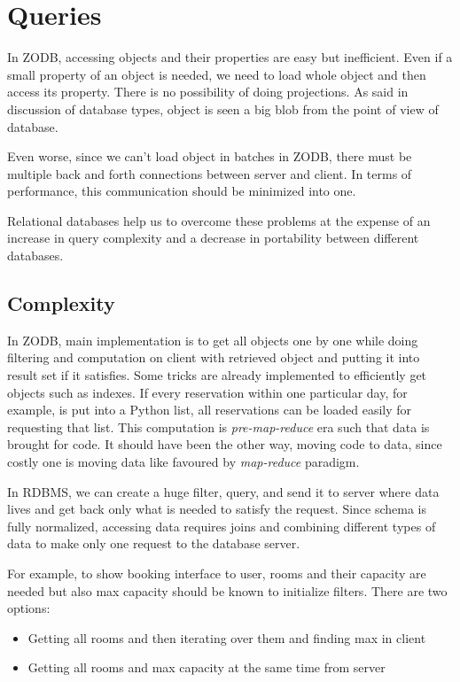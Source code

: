 \section{Queries}

In ZODB, accessing objects and their properties are easy but inefficient. Even if a small property of an object is needed, we need to load whole object and then access its property. There is no possibility of doing projections. As said in discussion of database types, object is seen a big blob from the point of view of database.

Even worse, since we can't load object in batches in ZODB, there must be multiple back and forth connections between server and client. In terms of performance, this communication should be minimized into one.

Relational databases help us to overcome these problems at the expense of an increase in query complexity and a decrease in portability between different databases.

\subsection{Complexity}

In ZODB, main implementation is to get all objects one by one while doing filtering and computation on client with retrieved object and putting it into result set if it satisfies. Some tricks are already implemented to efficiently get objects such as indexes. If every reservation within one particular day, for example, is put into a Python list, all reservations can be loaded easily for requesting that list. This computation is \textit{pre-map-reduce} era such that data is brought for code. It should have been the other way, moving code to data, since costly one is moving data like favoured by \textit{map-reduce} paradigm.

In RDBMS, we can create a huge filter, query, and send it to server where data lives and get back only what is needed to satisfy the request. Since schema is fully normalized, accessing data requires joins and combining different types of data to make only one request to the database server.

For example, to show booking interface to user, rooms and their capacity are needed but also max capacity should be known to initialize filters. There are two options:
\begin{itemize}
  \item Getting all rooms and then iterating over them and finding max in client
  \item Getting all rooms and max capacity at the same time from server
\end{itemize}


